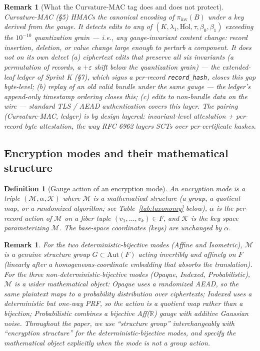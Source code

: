 \documentclass[11pt,letterpaper]{article}
\newtheorem{definition}[theorem]{Definition}
\newtheorem{remark}[theorem]{Remark}
\begin{document}
\begin{remark}[What the Curvature-MAC tag does and does not protect]
\label{rmk:cmac-scope}
Curvature-MAC (\S 5) HMACs the canonical encoding of
$\pi_{\mathrm{inv}}(B)$ under a key derived from the gauge.
It detects edits to any of $(K, \lambda_1, \overline{\mathrm{Hol}},
\tau, \beta_0, \beta_1)$ exceeding the $10^{-10}$ quantization grain
--- i.e., \emph{any gauge-invariant content change}: record
insertion, deletion, or value change large enough to perturb a
component. It does \emph{not} on its own detect (a) ciphertext edits
that preserve all six invariants (a permutation of records, a
$+\varepsilon$ shift below the quantization grain) --- the
extended-leaf ledger of Sprint K (\S 7), which signs a per-record
\texttt{record\_hash}, closes this gap byte-level; (b) replay of an
old valid bundle under the same gauge --- the ledger's
append-only timestamp ordering closes this; (c) edits to
non-bundle data on the wire --- standard TLS / AEAD authentication
covers this layer. The pairing
(Curvature-MAC, ledger) is by design layered: invariant-level
attestation + per-record byte attestation, the way RFC 6962 layers
SCTs over per-certificate hashes.
\end{remark}

\subsection{Encryption modes and their mathematical structure}
\label{sec:background:groups}

\begin{definition}[Gauge action of an encryption mode]
\label{def:gauge-action}
An \emph{encryption mode} is a triple $(\mathcal{M}, \alpha, \mathcal{K})$
where $\mathcal{M}$ is a mathematical structure (a group, a quotient
map, or a randomized algorithm; see Table~\ref{tab:taxonomy} below),
$\alpha$ is the per-record action of $\mathcal{M}$ on a fiber tuple
$(v_1, \ldots, v_k) \in F$, and $\mathcal{K}$ is the key space
parameterizing $\mathcal{M}$. The base-space coordinates (keys) are
unchanged by $\alpha$.
\end{definition}

\begin{remark}
For the two deterministic-bijective modes (Affine and Isometric),
$\mathcal{M}$ is a genuine structure group $G \subset \mathrm{Aut}(F)$
acting invertibly and affinely on $F$ (linearly after a
homogeneous-coordinate embedding that absorbs the translation). For the three non-deterministic-bijective
modes (Opaque, Indexed, Probabilistic), $\mathcal{M}$ is a wider
mathematical object: Opaque uses a randomized AEAD, so the same
plaintext maps to a probability distribution over ciphertexts;
Indexed uses a deterministic but one-way PRF, so the action is a
quotient map rather than a bijection; Probabilistic combines a
bijective Aff($\mathbb{R}$) gauge with additive Gaussian noise.
Throughout the paper, we use ``structure group'' interchangeably
with ``encryption structure'' for the deterministic-bijective modes,
and specify the mathematical object explicitly when the mode is not
a group action.
\end{remark}
\end{document}
